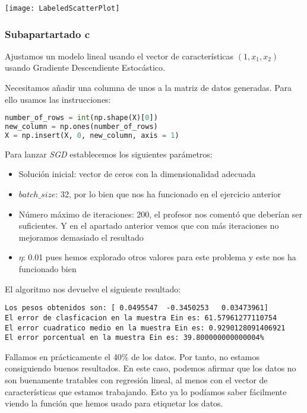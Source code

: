 \documentclass[11pt]{article}
\begin{document}
\texttt{[image: LabeledScatterPlot]}

\subsubsection{Subapartartado c}

Ajustamos un modelo lineal usando el vector de características $(1, x_1, x_2)$ usando Gradiente Descendiente Estocástico.

Necesitamos añadir una columna de unos a la matriz de datos generadas. Para ello usamos las instrucciones:

\begin{lstlisting}[language=Python]
number_of_rows = int(np.shape(X)[0])
new_column = np.ones(number_of_rows)
X = np.insert(X, 0, new_column, axis = 1)
\end{lstlisting}

Para lanzar \emph{SGD} establecemos los siguientes parámetros:

\begin{itemize}
    \item Solución inicial: vector de ceros con la dimensionalidad adecuada
    \item $batch\_size$: 32, por lo bien que nos ha funcionado en el ejercicio anterior
    \item Número máximo de iteraciones: 200, el profesor nos comentó que deberían ser suficientes. Y en el apartado anterior vemos que con más iteraciones no mejoramos demasiado el resultado
    \item $\eta$: 0.01 pues hemos explorado otros valores para este problema y este nos ha funcionado bien
\end{itemize}

El algoritmo nos devuelve el siguiente resultado:

\begin{lstlisting}
Los pesos obtenidos son: [ 0.0495547  -0.3450253   0.03473961]
El error de clasficacion en la muestra Ein es: 61.57961277110754
El error cuadratico medio en la muestra Ein es: 0.9290128091406921
El error porcentual en la muestra Ein es: 39.800000000000004%
\end{lstlisting}

Fallamos en prácticamente el 40\% de los datos. Por tanto, no estamos consiguiendo buenos resultados. En este caso, podemos afirmar que los datos no son buenamente tratables con regresión lineal, al menos con el vector de características que estamos trabajando. Esto ya lo podíamos saber fácilmente viendo la función que hemos usado para etiquetar los datos.
\end{document}
